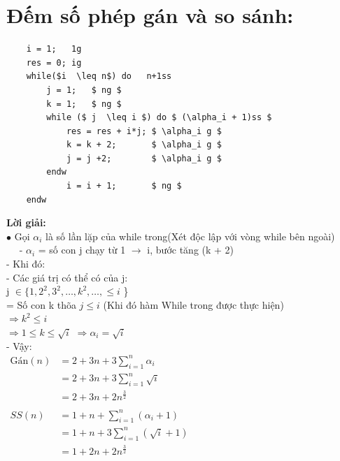 \documentclass[12pt, letterpaper]{article}
\begin{document}
{{\section{Đếm số phép gán và so sánh:}
\begin{lstlisting}
	i = 1;   1g
	res = 0; ig
	while($i  \leq n$) do   n+1ss    
		j = 1;   $ ng $
		k = 1;   $ ng $
		while ($ j  \leq i $) do $ (\alpha_i + 1)ss $
			res = res + i*j; $ \alpha_i g $
			k = k + 2;       $ \alpha_i g $
			j = j +2; 		 $ \alpha_i g $		
		endw
			i = i + 1; 		 $ ng $
	endw
	\end{lstlisting}
	\textbf{Lời giải:} \\
	$\bullet$ Gọi $\alpha_i$ là số lần lặp của while trong(Xét độc lập với vòng while bên ngoài)\\
	$\quad${ 
	- $\alpha_i$ = số con j chạy từ 1 $\rightarrow$ i, bước tăng (k + 2) \\
	- Khi đó:\\
	- Các giá trị có thể có của j: \\
    j $\in \{ 1, 2^2, 3^2, \ldots, k^2, \ldots, \leq i$ \}\\
	= Số con k thõa $ j \leq i$ (Khi đó hàm While trong được thực hiện)\\ 
	$\Rightarrow k^2 \leq i$\\
	$\Rightarrow 1 \leq k \leq \sqrt{i}$
	$\Rightarrow \alpha_i = \sqrt{i}$\\
	- Vậy: \\
	$ \begin{aligned}
		\text{Gán}(n) & = 2 + 3n + 3\sum^{n}_{i = 1}\alpha_i\\
			& = 2 + 3n + 3\sum^{n}_{i = 1}\sqrt i\\
			& = 2 + 3n + 2n^\frac{3}{2}\\
			\\SS(n) & = 1 + n + \sum^{n}_{i = 1}(\alpha_i + 1)\\
			& = 1 + n + 3\sum^{n}_{i = 1}(\sqrt i + 1)\\
			& = 1 + 2n + 2n^\frac{3}{2}\\
	\end{aligned} $ \\
}}}
\end{document}
